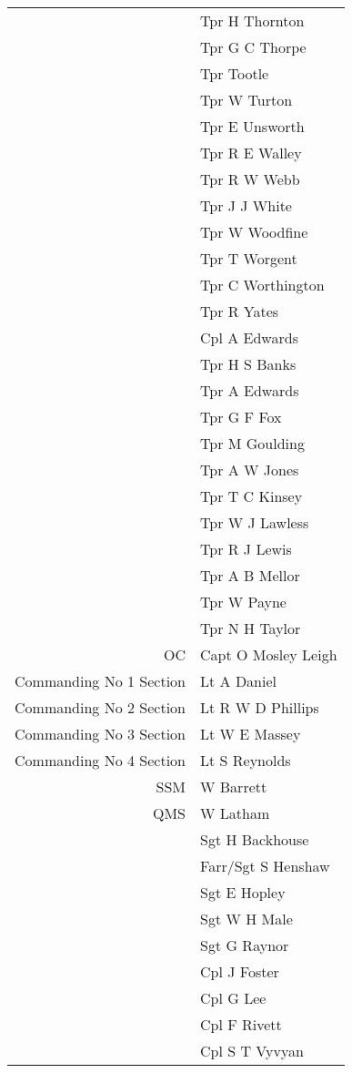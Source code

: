\begin{center}
\begin{tabular}{rl}
    & Tpr H Thornton \\
    & Tpr G C Thorpe \\
    & Tpr Tootle \\
    & Tpr W Turton \\
    & Tpr E Unsworth \\
    & Tpr R E Walley \\
    & Tpr R W Webb \\
    & Tpr J J White \\
    & Tpr W Woodfine \\
    & Tpr T Worgent \\
    & Tpr C Worthington \\
    & Tpr R Yates \\
    & Cpl A Edwards \\
    & Tpr H S Banks \\
    & Tpr A Edwards \\
    & Tpr G F Fox \\
    & Tpr M Goulding \\
    & Tpr A W Jones \\
    & Tpr T C Kinsey \\
    & Tpr W J Lawless \\
    & Tpr R J Lewis \\
    & Tpr A B Mellor \\
    & Tpr W Payne \\
    & Tpr N H Taylor \\
    OC & Capt O Mosley Leigh \\
    Commanding No 1 Section & Lt A Daniel \\
    Commanding No 2 Section & Lt R W D Phillips \\
    Commanding No 3 Section & Lt W E Massey \\
    Commanding No 4 Section & Lt S Reynolds \\
    SSM & W Barrett \\
    QMS & W Latham \\
    & Sgt H Backhouse \\
    & Farr/Sgt S Henshaw \\
    & Sgt E Hopley \\
    & Sgt W H Male \\
    & Sgt G Raynor \\
    & Cpl J Foster \\
    & Cpl G Lee \\
    & Cpl F Rivett \\
    & Cpl S T Vyvyan \\

\end{tabular}
\end{center}
